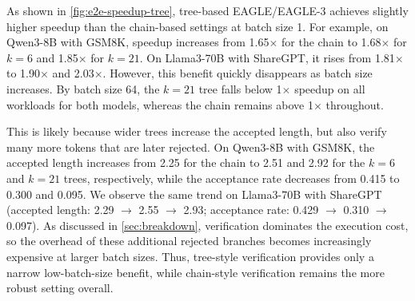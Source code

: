 As shown in \autoref{fig:e2e-speedup-tree}, tree-based EAGLE/EAGLE-3 achieves slightly higher speedup than the chain-based settings at batch size 1. For example, on Qwen3-8B with GSM8K, speedup increases from 1.65$\times$ for the chain to 1.68$\times$ for $k{=}6$ and 1.85$\times$ for $k{=}21$. On Llama3-70B with ShareGPT, it rises from 1.81$\times$ to 1.90$\times$ and 2.03$\times$. However, this benefit quickly disappears as batch size increases. By batch size 64, the $k{=}21$ tree falls below 1$\times$ speedup on all workloads for both models, whereas the chain remains above 1$\times$ throughout.

This is likely because wider trees increase the accepted length, but also verify many more tokens that are later rejected. On Qwen3-8B with GSM8K, the accepted length increases from 2.25 for the chain to 2.51 and 2.92 for the $k{=}6$ and $k{=}21$ trees, respectively, while the acceptance rate decreases from 0.415 to 0.300 and 0.095. We observe the same trend on Llama3-70B with ShareGPT (accepted length: 2.29 $\rightarrow$ 2.55 $\rightarrow$ 2.93; acceptance rate: 0.429 $\rightarrow$ 0.310 $\rightarrow$ 0.097). As discussed in \autoref{sec:breakdown}, verification dominates the execution cost, so the overhead of these additional rejected branches becomes increasingly expensive at larger batch sizes. Thus, tree-style verification provides only a narrow low-batch-size benefit, while chain-style verification remains the more robust setting overall.

